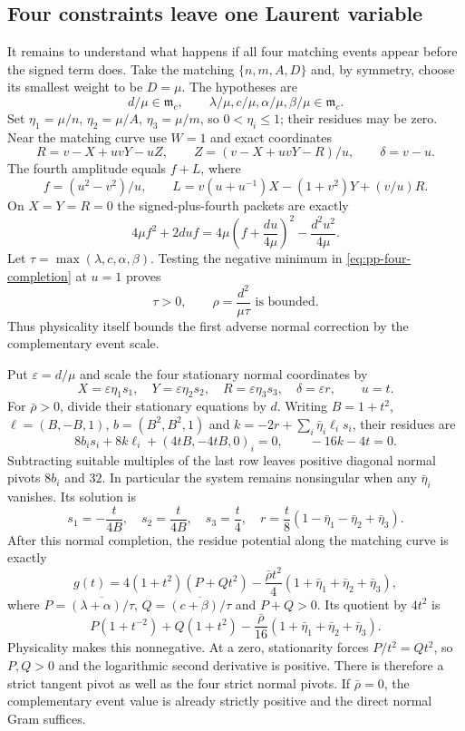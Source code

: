 \subsection{Four constraints leave one Laurent variable}
It remains to understand what happens if all four matching events appear
before the signed term does.  Take the matching $\{n,m,A,D\}$ and, by
symmetry, choose its smallest weight to be $D=\mu$.  The hypotheses are
\[
 d/\mu\in\mathfrak m_c,\qquad
 \lambda/\mu,c/\mu,\alpha/\mu,\beta/\mu\in\mathfrak m_c.
\]
Set $\eta_1=\mu/n$, $\eta_2=\mu/A$, $\eta_3=\mu/m$, so
$0<\eta_i\leq1$; their residues may be zero.  Near the matching curve use
$W=1$ and exact coordinates
\[
 R=v-X+uvY-uZ,\qquad
 Z=(v-X+uvY-R)/u,\qquad \delta=v-u.
\]
The fourth amplitude equals $f+L$, where
\[
 f=(u^2-v^2)/u,\qquad
 L=v(u+u^{-1})X-(1+v^2)Y+(v/u)R.
\]
On $X=Y=R=0$ the signed-plus-fourth packets are exactly
\begin{equation}\label{eq:pp-four-completion}
 4\mu f^2+2duf
 =4\mu\left(f+\frac{du}{4\mu}\right)^2
                  -\frac{d^2u^2}{4\mu}.
\end{equation}
Let $\tau=\max(\lambda,c,\alpha,\beta)$.  Testing the negative minimum in
\eqref{eq:pp-four-completion} at $u=1$ proves
\[
                  \tau>0,\qquad \rho=\frac{d^2}{\mu\tau}
                  \text{ is bounded}.
\]
Thus physicality itself bounds the first adverse normal correction by the
complementary event scale.

Put $\varepsilon=d/\mu$ and scale the four stationary normal coordinates by
\[
 X=\varepsilon\eta_1s_1,\quad
 Y=\varepsilon\eta_2s_2,\quad
 R=\varepsilon\eta_3s_3,\quad \delta=\varepsilon r,
 \qquad u=t.
\]
For $\bar\rho>0$, divide their stationary equations by $d$.  Writing
$B=1+t^2$, $\ell=(B,-B,1)$, $b=(B^2,B^2,1)$ and
$k=-2r+\sum_i\bar\eta_i\ell_i s_i$, their residues are
\[
 8b_i s_i+8k\ell_i+(4tB,-4tB,0)_i=0,
 \qquad -16k-4t=0.
\]
Subtracting suitable multiples of the last row leaves positive diagonal
normal pivots $8b_i$ and $32$.  In particular the system remains nonsingular
when any $\bar\eta_i$ vanishes.  Its solution is
\[
 s_1=-\frac{t}{4B},\quad s_2=\frac{t}{4B},\quad s_3=\frac t4,
 \quad r=\frac t8(1-\bar\eta_1-\bar\eta_2+\bar\eta_3).
\]
After this normal completion, the residue potential along the matching
curve is exactly
\[
 g(t)=4(1+t^2)(P+Qt^2)
       -\frac{\bar\rho t^2}{4}(1+\bar\eta_1+\bar\eta_2+\bar\eta_3),
\]
where $P=\overline{(\lambda+\alpha)/\tau}$,
$Q=\overline{(c+\beta)/\tau}$ and $P+Q>0$.  Its quotient by $4t^2$ is
\begin{equation}\label{eq:pp-final-circuit}
 P(1+t^{-2})+Q(1+t^2)
       -\frac{\bar\rho}{16}(1+\bar\eta_1+\bar\eta_2+\bar\eta_3).
\end{equation}
Physicality makes this nonnegative.  At a zero, stationarity forces
$P/t^2=Qt^2$, so $P,Q>0$ and the logarithmic second derivative is positive.
There is therefore a strict tangent pivot as well as the four strict normal
pivots.  If $\bar\rho=0$, the complementary event value is already strictly
positive and the direct normal Gram suffices.

